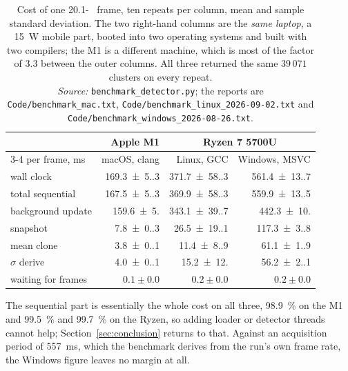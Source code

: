 \documentclass[a4paper,headsepline,oneside,11pt]{scrartcl}
\newcommand{\figsource}[1]{\\[3pt]{\footnotesize\emph{Source:} #1}}
\begin{document}
\begin{table}[htbp]
  \centering
  \begin{tabular}{@{}l rrr@{}}
    \toprule
    & Apple M1 & \multicolumn{2}{c}{Ryzen 7 5700U} \\
    \cmidrule(l){3-4}
    per frame, \si{\milli\second} & macOS, clang & Linux, GCC & Windows, MSVC \\
    \midrule
    wall clock              & \num{169.3(5.3)} & \num{371.7(58.3)} & \num{561.4(13.7)} \\
    total sequential        & \num{167.5(5.3)} & \num{369.9(58.3)} & \num{559.9(13.5)} \\
    \quad background update & \num{159.6(5.0)} & \num{343.1(39.7)} & \num{442.3(10.0)} \\
    \quad snapshot          & \num{7.8(0.3)}   & \num{26.5(19.1)}  & \num{117.3(3.8)} \\
    \quad\quad mean clone   & \num{3.8(0.1)}   & \num{11.4(8.9)}   & \num{61.1(1.9)} \\
    \quad\quad $\sigma$ derive & \num{4.0(0.1)} & \num{15.2(12.0)} & \num{56.2(2.1)} \\
    \quad waiting for frames & $\num{0.1} \pm \num{0.0}$ & $\num{0.2} \pm \num{0.0}$ & $\num{0.2} \pm \num{0.0}$ \\
    \bottomrule
  \end{tabular}
  \caption{Cost of one \num{20.1}-\si{\mega\pixel} frame, ten repeats per column,
  mean and sample standard deviation. The two right-hand columns are the
  \emph{same laptop}, a \SI{15}{\watt} mobile part, booted into two operating
  systems and built with two compilers; the M1 is a different machine, which is
  most of the factor of $3.3$ between the outer columns. All three returned the
  same $39\,071$ clusters on every
  repeat.\figsource{\texttt{benchmark\_detector.py}; the reports are
  \texttt{Code/benchmark\_mac.txt},
  \texttt{Code/benchmark\_linux\_2026-09-02.txt} and
  \texttt{Code/benchmark\_windows\_2026-08-26.txt}.}}
  \label{tab:timing}
\end{table}

The sequential part is essentially the whole cost on all three,
\SI{98.9}{\percent} on the M1 and \SI{99.5}{\percent} and \SI{99.7}{\percent}
on the Ryzen, so adding loader or detector threads cannot help;
Section~\ref{sec:conclusion} returns to that. Against an acquisition period of
\SI{557}{\milli\second}, which the benchmark derives from the run's own frame
rate, the Windows figure leaves no margin at all.
\end{document}
